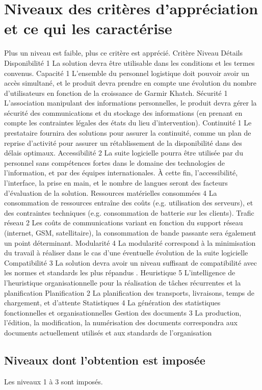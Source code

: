 \documentclass[11pt,fleqn]{book} %
\begin{document}
\section{Niveaux des critères d'appréciation et ce qui les caractérise}
Plus un niveau est faible, plus ce critère est apprécié.
Critère
Niveau
Détails
Disponibilité
1
La solution devra être utilisable dans les conditions et les termes convenus.
Capacité
1
L'ensemble du personnel logistique doit pouvoir avoir un accès simultané, et le produit devra prendre en compte une évolution du nombre d'utilisateurs en fonction de la croissance de Garmir Khatch.
Sécurité
1
L'association manipulant des informations personnelles, le produit devra gérer la sécurité des communications et du stockage des informations (en prenant en compte les contraintes légales des états du lieu d'intervention).
Continuité
1
Le prestataire fournira des solutions pour assurer la continuité, comme un plan de reprise d'activité pour assurer un rétablissement de la disponibilité dans des délais optimaux.
Accessibilité
2
La suite logicielle pourra être utilisée par du personnel sans compétences fortes dans le domaine des technologies de l'information, et par des équipes internationales. À cette fin, l'accessibilité, l'interface, la prise en main, et le nombre de langues seront des facteurs d'évaluation de la solution.
Ressources matérielles consommées
4
La consommation de ressources entraîne des coûts (e.g. utilisation des serveurs), et des contraintes techniques (e.g. consommation de batterie sur les clients).
Trafic réseau
2
Les coûts de communications variant en fonction du support réseau (internet, GSM, satellitaire), la consommation de bande passante sera également un point déterminant.
Modularité
4
La modularité correspond à la minimisation du travail à réaliser dans le cas d'une éventuelle évolution de la suite logicielle
Compatibilité
3
La solution devra avoir un niveau suffisant de compatibilité avec les normes et standards les plus répandus .
Heuristique
5
\og{}L'intelligence\fg{} de l'heuristique organisationnelle pour la réalisation de tâches récurrentes et la planification
Planification
2
La planification des transports, livraisons, temps de chargement, et d'attente
Statistiques
4
La génération des statistiques fonctionnelles et organisationnelles
Gestion des documents
3
La production, l'édition, la modification, la numérisation des documents correspondra aux documents actuellement utilisés et aux standards de l'organisation

\subsection{Niveaux dont l'obtention est imposée}
Les niveaux 1 à 3 sont imposés.
\end{document}

